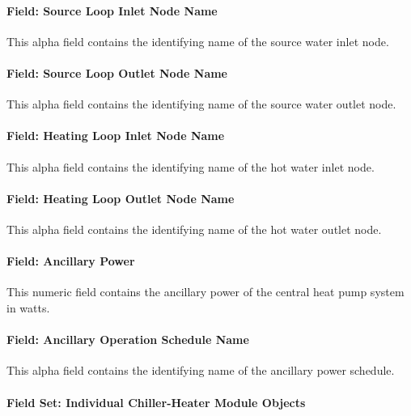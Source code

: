 \paragraph{Field: Source Loop Inlet Node Name}\label{field-source-loop-inlet-node-name}

This alpha field contains the identifying name of the source water inlet node.

\paragraph{Field: Source Loop Outlet Node Name}\label{field-source-loop-outlet-node-name}

This alpha field contains the identifying name of the source water outlet node.

\paragraph{Field: Heating Loop Inlet Node Name}\label{field-heating-loop-inlet-node-name}

This alpha field contains the identifying name of the hot water inlet node.

\paragraph{Field: Heating Loop Outlet Node Name}\label{field-heating-loop-outlet-node-name}

This alpha field contains the identifying name of the hot water outlet node.

\paragraph{Field: Ancillary Power}\label{field-ancillary-power-000}

This numeric field contains the ancillary power of the central heat pump system in watts.

\paragraph{Field: Ancillary Operation Schedule Name}\label{field-ancillary-operation-schedule-name}

This alpha field contains the identifying name of the ancillary power schedule.

\paragraph{Field Set: Individual Chiller-Heater Module Objects}\label{field-set-individual-chiller-heater-module-objects}

